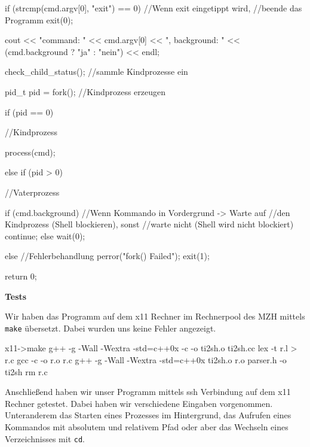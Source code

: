 \documentclass{ti2}
\begin{document}
\begin{listing}{1}
{{	if (strcmp(cmd.argv[0], "exit") == 0) {//Wenn exit eingetippt wird,
	                                      //beende das Programm
	  exit(0);
	}
		
	cout << "command: " << cmd.argv[0]
		  << ", background: " << (cmd.background ? "ja" : "nein") << endl;
       
	check_child_status(); //sammle Kindprozesse ein
	
	pid_t pid = fork(); //Kindprozess erzeugen
	
	if (pid == 0) { //Kindprozess
	 
	  process(cmd);
	    
	  
	} else if (pid > 0) { //Vaterprozess

	  if (cmd.background) { //Wenn Kommando in Vordergrund -> Warte auf
	                       //den Kindprozess (Shell blockieren), sonst
	                      //warte nicht (Shell wird nicht blockiert)
	    continue;
	  } else {
	    wait(0);
	  }
	 
	  
	} else { //Fehlerbehandlung
	  perror("fork() Failed");
	  exit(1);
	}
    }
       return 0;
 }

\end{listing}
\textbf{Tests}

Wir haben das Programm auf dem x11 Rechner im Rechnerpool des MZH mittels \texttt{make} übersetzt. Dabei wurden uns keine Fehler angezeigt.

\begin{listing}{1}
x11->make
g++ -g -Wall -Wextra -std=c++0x   -c -o ti2sh.o ti2sh.cc
lex  -t r.l > r.c
gcc    -c -o r.o r.c
g++ -g -Wall -Wextra -std=c++0x    ti2sh.o r.o parser.h   -o ti2sh
rm r.c
\end{listing}

Anschließend haben wir unser Programm mittels ssh Verbindung auf dem x11 Rechner getestet. Dabei haben wir verschiedene Eingaben vorgenommen. Unteranderem das Starten eines Prozesses im Hintergrund, das Aufrufen eines Kommandos mit absolutem und relativem Pfad oder aber das Wechseln eines Verzeichnisses mit \texttt{cd}.
\end{document}
